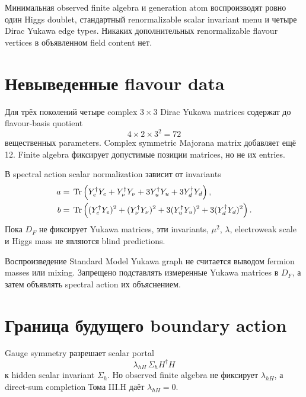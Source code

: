 \begin{theorem}
Минимальная observed finite algebra и generation atom воспроизводят ровно
один Higgs doublet, стандартный renormalizable scalar invariant menu и четыре
Dirac Yukawa edge types. Никаких дополнительных renormalizable flavour
vertices в объявленном field content нет.
\end{theorem}

\section{Невыведенные flavour data}

Для трёх поколений четыре complex \(3\times3\) Dirac Yukawa matrices содержат
до flavour-basis quotient
\begin{equation}
4\times2\times3^2=72
\end{equation}
вещественных parameters. Complex symmetric Majorana matrix добавляет ещё 12.
Finite algebra фиксирует допустимые позиции matrices, но не их entries.

В spectral action scalar normalization зависит от invariants
\begin{align}
a={}&\operatorname{Tr}\left(
Y_e^\dagger Y_e+Y_\nu^\dagger Y_\nu
+3Y_u^\dagger Y_u+3Y_d^\dagger Y_d
\right),\\
b={}&\operatorname{Tr}\left(
(Y_e^\dagger Y_e)^2+(Y_\nu^\dagger Y_\nu)^2
+3(Y_u^\dagger Y_u)^2+3(Y_d^\dagger Y_d)^2
\right).
\end{align}
Пока \(D_F\) не фиксирует Yukawa matrices, эти invariants, \(\mu^2\),
\(\lambda\), electroweak scale и Higgs mass не являются blind predictions.

\begin{nogocriterion}
Воспроизведение Standard Model Yukawa graph не считается выводом fermion
masses или mixing. Запрещено подставлять измеренные Yukawa matrices в
\(D_F\), а затем объявлять spectral action их объяснением.
\end{nogocriterion}

\section{Граница будущего boundary action}

Gauge symmetry разрешает scalar portal
\begin{equation}
\lambda_{hH}\,\Sigma_h H^\dagger H
\end{equation}
к hidden scalar invariant \(\Sigma_h\). Но observed finite algebra не
фиксирует \(\lambda_{hH}\), а direct-sum completion Тома III.H даёт
\(\lambda_{hH}=0\).

